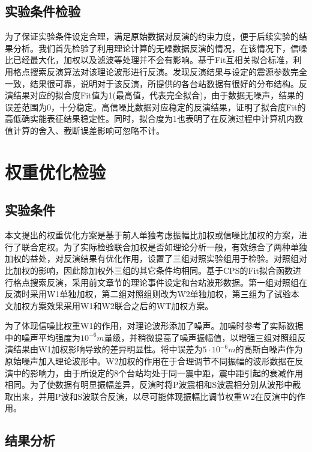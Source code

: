 \subsection{实验条件检验}
为了保证实验条件设定合理，满足原始数据对反演的约束力度，便于后续实验的结果分析。我们首先检验了利用理论计算的无噪数据反演的情况，在该情况下，信噪比已经最大化，加权以及滤波等处理并不会有影响。基于Fit互相关拟合标准，利用格点搜索反演算法对该理论波形进行反演。发现反演结果与设定的震源参数完全一致，结果很可靠，说明对于该反演，所提供的各台站数据有很好的分布结构。反演结果对应的拟合度Fit值为1(最高值，代表完全拟合)，由于数据无噪声，结果的误差范围为0，十分稳定。高信噪比数据对应稳定的反演结果，证明了拟合度Fit的高低确实能表征结果稳定性。同时，拟合度为1也表明了在反演过程中计算机内数值计算的舍入、截断误差影响可忽略不计。

\section{权重优化检验}

\subsection{实验条件}
本文提出的权重优化方案是基于前人单独考虑振幅比加权或信噪比加权的方案，进行了联合定权。为了实际检验联合加权是否如理论分析一般，有效综合了两种单独加权的益处，对反演结果有优化作用，设置了三组对照实验组用于检验。对照组对比加权的影响，因此除加权外三组的其它条件均相同。基于CPS的Fit拟合函数进行格点搜索反演，采用前文章节的理论事件设定和台站波形数据。第一组对照组在反演时采用W1单独加权，第二组对照组则改为W2单独加权，第三组为了试验本文加权方案效果采用W1和W2联合之后的WT加权方案。

为了体现信噪比权重W1的作用，对理论波形添加了噪声。加噪时参考了实际数据中的噪声平均强度为$10^{-6}m$量级，并稍微提高了噪声振幅值，以增强三组对照组反演结果由W1加权影响导致的差异明显性。将中误差为$5\cdot10^{-6}m$的高斯白噪声作为原始噪声加入理论波形中。W2加权的作用在于合理调节不同振幅的波形数据在反演中的影响力，由于所设定的8个台站均处于同一震中距，震中距引起的衰减作用相同。为了使数据有明显振幅差异，反演时将P波震相和S波震相分别从波形中截取出来，并用P波和S波联合反演，以尽可能体现振幅比调节权重W2在反演中的作用。

\subsection{结果分析}

